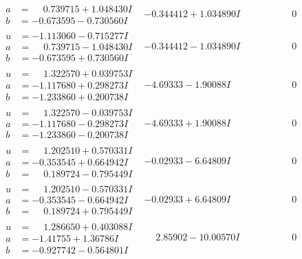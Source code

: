 \documentclass[1p]{elsarticle_modified}
\theoremstyle{definition}
\begin{document}
$$\begin{array}{c|c|c}
\begin{aligned}
a &= \phantom{-}0.739715 + 1.048430 I \\
b &= -0.673595 - 0.730560 I\end{aligned}
 & -0.344412 + 1.034890 I & \phantom{-0.000000 } 0 \\ \hline\begin{aligned}
u &= -1.113060 - 0.715277 I \\
a &= \phantom{-}0.739715 - 1.048430 I \\
b &= -0.673595 + 0.730560 I\end{aligned}
 & -0.344412 - 1.034890 I & \phantom{-0.000000 } 0 \\ \hline\begin{aligned}
u &= \phantom{-}1.322570 + 0.039753 I \\
a &= -1.117680 + 0.298273 I \\
b &= -1.233860 + 0.200738 I\end{aligned}
 & -4.69333 - 1.90088 I & \phantom{-0.000000 } 0 \\ \hline\begin{aligned}
u &= \phantom{-}1.322570 - 0.039753 I \\
a &= -1.117680 - 0.298273 I \\
b &= -1.233860 - 0.200738 I\end{aligned}
 & -4.69333 + 1.90088 I & \phantom{-0.000000 } 0 \\ \hline\begin{aligned}
u &= \phantom{-}1.202510 + 0.570331 I \\
a &= -0.353545 + 0.664942 I \\
b &= \phantom{-}0.189724 - 0.795449 I\end{aligned}
 & -0.02933 - 6.64809 I & \phantom{-0.000000 } 0 \\ \hline\begin{aligned}
u &= \phantom{-}1.202510 - 0.570331 I \\
a &= -0.353545 - 0.664942 I \\
b &= \phantom{-}0.189724 + 0.795449 I\end{aligned}
 & -0.02933 + 6.64809 I & \phantom{-0.000000 } 0 \\ \hline\begin{aligned}
u &= \phantom{-}1.286650 + 0.403088 I \\
a &= -1.41755 + 1.36786 I \\
b &= -0.927742 - 0.564801 I\end{aligned}
 & \phantom{-}2.85902 - 10.00570 I & \phantom{-0.000000 } 0 \\ \hline\begin{aligned}

\end{aligned}
\end{array}$$
\end{document}
